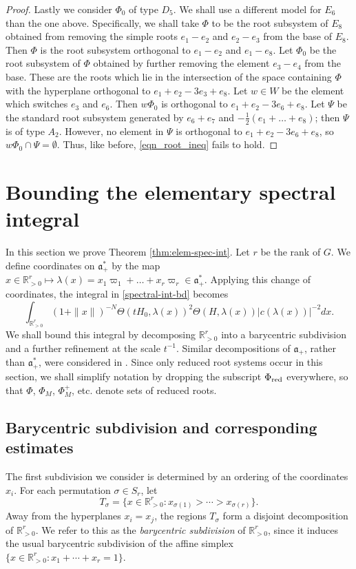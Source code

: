 \documentclass[12pt]{amsart}
\theoremstyle{remark}
\newcommand{\R}{\mathbb R}
\newcommand{\ga}{\mathfrak a}
\newcommand{\be}{\begin{equation}}
\newcommand{\ee}{\end{equation}}
\begin{document}
\begin{proof}
Lastly we consider $\Phi_0$ of type $D_5$. We shall use a different model for $E_6$ than the one above. Specifically, we shall take $\Phi$ to be the root subsystem of $E_8$ obtained from removing the simple roots $e_1 - e_2$ and $e_2 - e_3$ from the base of $E_8$. Then $\Phi$ is the root subsystem orthogonal to $e_1 - e_2$ and $e_1 - e_8$. Let $\Phi_0$ be the root subsystem of $\Phi$ obtained by further removing the element $e_3 - e_4$ from the base. These are the roots which lie in the intersection of the space containing $\Phi$ with the hyperplane orthogonal to $e_1 + e_2 - 3 e_3 + e_8$. Let $w \in W$ be the element which switches $e_3$ and $e_6$. Then $w \Phi_0$ is orthogonal to $e_1 + e_2 - 3 e_6 + e_8$. Let $\Psi$ be the standard root subsystem generated by $e_6 + e_7$ and $-\frac{1}{2}(e_1 + \dots + e_8)$; then $\Psi$ is of type $A_2$. However, no element in $\Psi$ is orthogonal to $e_1 + e_2 - 3 e_6 + e_8$, so $w \Phi_0 \cap \Psi = \emptyset$. Thus, like before, \eqref{eqn_root_ineq} fails to hold.
\end{proof}


\section{Bounding the elementary spectral integral}\label{sec:elem-spec-int}

In this section we prove Theorem \ref{thm:elem-spec-int}. Let $r$ be the rank of $G$. We define coordinates on $\mathfrak{a}^*_+$ by the map $x \in \R_{> 0}^r \mapsto \lambda(x) = x_1 \varpi_1 + \ldots + x_r \varpi_r \in \mathfrak{a}^*_+$.  Applying this change of coordinates, the integral in \eqref{spectral-int-bd} becomes
\be
\label{spectral-int-2}
\int_{ \R_{> 0}^r} (1 + \| x \|)^{-N} \Theta(tH_0, \lambda(x))^2 \Theta( H, \lambda(x)) |c(\lambda(x))|^{-2} dx.
\ee
We shall bound this integral by decomposing $\R_{> 0}^r$ into a barycentric subdivision and a further refinement at the scale $t^{-1}$. Similar decompositions of $\ga_+$, rather than $\ga_+^*$, were considered in \cite{Marshall,Zhang}. Since only reduced root systems occur in this section, we shall simplify notation by dropping the subscript $\Phi_{\textnormal{red}}$ everywhere, so that $\Phi$, $\Phi_M$, $\Phi_M^+$, etc. denote sets of reduced roots.



\subsection{Barycentric subdivision and corresponding estimates}
The first subdivision we consider is determined by an ordering of the coordinates $x_i$. For each permutation $\sigma \in S_r$, let
\[
T_\sigma=\{x\in \R_{>0}^r: x_{\sigma(1)} > \cdots > x_{\sigma(r)}\}.
\]
Away from the hyperplanes $x_i=x_j$, the regions $T_\sigma$ form a disjoint decomposition of  $\R_{> 0}^r$. We refer to this as the \textit{barycentric subdivision} of $\R_{>0}^r$, since it induces the usual barycentric subdivision of the affine simplex $\{x\in \R_{>0}^r: x_1+\cdots +x_r=1\}$.
\end{document}
